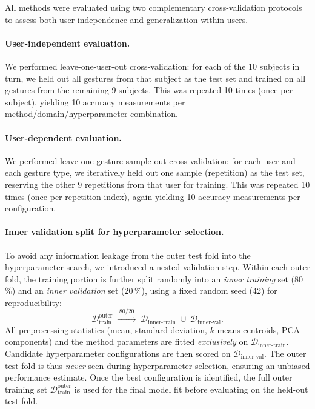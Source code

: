 All methods were evaluated using two complementary cross-validation protocols to
assess both user-independence and generalization within users.
 
\paragraph{User-independent evaluation.} We performed leave-one-user-out
cross-validation: for each of the 10 subjects in turn, we held out all gestures
from that subject as the test set and trained on all gestures from the
remaining 9 subjects. This was repeated 10 times (once per subject), yielding
10 accuracy measurements per method/domain/hyperparameter combination.
 
\paragraph{User-dependent evaluation.} We performed leave-one-gesture-sample-out
cross-validation: for each user and each gesture type, we iteratively held out
one sample (repetition) as the test set, reserving the other 9 repetitions from
that user for training. This was repeated 10 times (once per repetition index),
again yielding 10 accuracy measurements per configuration.
 
\paragraph{Inner validation split for hyperparameter selection.}
To avoid any information leakage from the outer test fold into the
hyperparameter search, we introduced a nested validation step. Within each outer
fold, the training portion is further split randomly into an \emph{inner
training} set (80\,\%) and an \emph{inner validation} set (20\,\%), using a
fixed random seed (42) for reproducibility:
\begin{equation}
    \mathcal{D}_{\text{train}}^{\text{outer}}
    \;\xrightarrow{\;80 / 20\;}\;
    \mathcal{D}_{\text{inner-train}} \;\cup\; \mathcal{D}_{\text{inner-val}} .
\end{equation}
All preprocessing statistics (mean, standard deviation, $k$-means centroids,
PCA components) and the method parameters are fitted \emph{exclusively} on
$\mathcal{D}_{\text{inner-train}}$. Candidate hyperparameter configurations are
then scored on $\mathcal{D}_{\text{inner-val}}$. The outer test fold is thus
\emph{never} seen during hyperparameter selection, ensuring an unbiased
performance estimate. Once the best configuration is identified, the full outer
training set $\mathcal{D}_{\text{train}}^{\text{outer}}$ is used for the final
model fit before evaluating on the held-out test fold.


